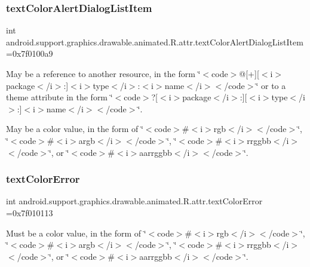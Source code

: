 \subsubsection{\texorpdfstring{text\+Color\+Alert\+Dialog\+List\+Item}{textColorAlertDialogListItem}}
{\footnotesize\ttfamily int android.\+support.\+graphics.\+drawable.\+animated.\+R.\+attr.\+text\+Color\+Alert\+Dialog\+List\+Item =0x7f0100a9\hspace{0.3cm}{\ttfamily [static]}}

May be a reference to another resource, in the form \char`\"{}$<$code$>$@\mbox{[}+\mbox{]}\mbox{[}$<$i$>$package$<$/i$>$\+:\mbox{]}$<$i$>$type$<$/i$>$\+:$<$i$>$name$<$/i$>$$<$/code$>$\char`\"{} or to a theme attribute in the form \char`\"{}$<$code$>$?\mbox{[}$<$i$>$package$<$/i$>$\+:\mbox{]}\mbox{[}$<$i$>$type$<$/i$>$\+:\mbox{]}$<$i$>$name$<$/i$>$$<$/code$>$\char`\"{}. 

May be a color value, in the form of \char`\"{}$<$code$>$\#$<$i$>$rgb$<$/i$>$$<$/code$>$\char`\"{}, \char`\"{}$<$code$>$\#$<$i$>$argb$<$/i$>$$<$/code$>$\char`\"{}, \char`\"{}$<$code$>$\#$<$i$>$rrggbb$<$/i$>$$<$/code$>$\char`\"{}, or \char`\"{}$<$code$>$\#$<$i$>$aarrggbb$<$/i$>$$<$/code$>$\char`\"{}. \mbox{\label{classandroid_1_1support_1_1graphics_1_1drawable_1_1animated_1_1R_1_1attr_ae25599e44c1f5cfa4096a4d9403aa127}} 
\subsubsection{\texorpdfstring{text\+Color\+Error}{textColorError}}
{\footnotesize\ttfamily int android.\+support.\+graphics.\+drawable.\+animated.\+R.\+attr.\+text\+Color\+Error =0x7f010113\hspace{0.3cm}{\ttfamily [static]}}

Must be a color value, in the form of \char`\"{}$<$code$>$\#$<$i$>$rgb$<$/i$>$$<$/code$>$\char`\"{}, \char`\"{}$<$code$>$\#$<$i$>$argb$<$/i$>$$<$/code$>$\char`\"{}, \char`\"{}$<$code$>$\#$<$i$>$rrggbb$<$/i$>$$<$/code$>$\char`\"{}, or \char`\"{}$<$code$>$\#$<$i$>$aarrggbb$<$/i$>$$<$/code$>$\char`\"{}. 

